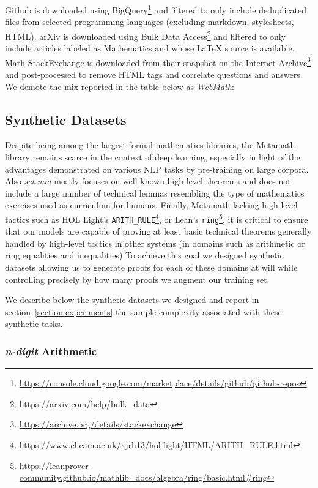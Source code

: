 Github is downloaded using BigQuery\footnote{\url{https://console.cloud.google.com/marketplace/details/github/github-repos}} and filtered to only include deduplicated files from selected programming languages (excluding markdown, stylesheets, HTML). arXiv is downloaded using Bulk Data Access\footnote{\url{https://arxiv.com/help/bulk\_data}} and filtered to only include articles labeled as Mathematics and whose LaTeX source is available. Math StackExchange is downloaded from their snapshot on the Internet Archive\footnote{\url{https://archive.org/details/stackexchange}} and post-processed to remove HTML tags and correlate questions and answers. We demote the mix reported in the table below as \textit{WebMath}:

\subsection{Synthetic Datasets}

Despite being among the largest formal mathematics libraries, the Metamath library remains scarce in the context of deep learning, especially in light of the advantages demonstrated on various NLP tasks by pre-training on large corpora. Also \textit{set.mm} mostly focuses on well-known high-level theorems and does not include a large number of technical lemmas resembling the type of mathematics exercises used as curriculum for humans. Finally, Metamath lacking high level tactics such as HOL Light's \verb|ARITH_RULE|\footnote{\url{https://www.cl.cam.ac.uk/~jrh13/hol-light/HTML/ARITH_RULE.html}}, or Lean's \verb|ring|\footnote{\url{https://leanprover-community.github.io/mathlib_docs/algebra/ring/basic.html\#ring}}, it is critical to ensure that our models are capable of proving at least basic technical theorems generally handled by high-level tactics in other systems (in domains such as arithmetic or ring equalities and inequalities) To achieve this goal we designed synthetic datasets allowing us to generate proofs for each of these domains at will while controlling precisely by how many proofs we augment our training set.

We describe below the synthetic datasets we designed and report in section~\ref{section:experiments} the sample complexity associated with these synthetic tasks.

\subsubsection{\textit{n-digit} Arithmetic}


